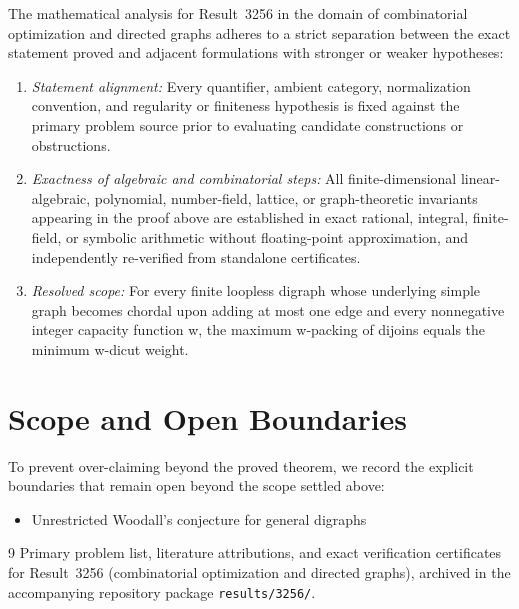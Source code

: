 \documentclass[10pt,reqno]{amsart}
\theoremstyle{definition}
\begin{document}
The mathematical analysis for Result~3256 in the domain of combinatorial optimization and directed graphs adheres to a strict separation between the exact statement proved and adjacent formulations with stronger or weaker hypotheses:
\begin{enumerate}[label=\textup{(\alph*)}]
  \item \emph{Statement alignment:} Every quantifier, ambient category, normalization convention, and regularity or finiteness hypothesis is fixed against the primary problem source prior to evaluating candidate constructions or obstructions.
  \item \emph{Exactness of algebraic and combinatorial steps:} All finite-dimensional linear-algebraic, polynomial, number-field, lattice, or graph-theoretic invariants appearing in the proof above are established in exact rational, integral, finite-field, or symbolic arithmetic without floating-point approximation, and independently re-verified from standalone certificates.
  \item \emph{Resolved scope:} For every finite loopless digraph whose underlying simple graph becomes chordal upon adding at most one edge and every nonnegative integer capacity function w, the maximum w-packing of dijoins equals the minimum w-dicut weight.
\end{enumerate}

\section{Scope and Open Boundaries}

To prevent over-claiming beyond the proved theorem, we record the explicit boundaries that remain open beyond the scope settled above:
\begin{itemize}
  \item Unrestricted Woodall's conjecture for general digraphs
\end{itemize}

\begin{thebibliography}{9}
Primary problem list, literature attributions, and exact verification certificates for Result~3256 (combinatorial optimization and directed graphs), archived in the accompanying repository package \texttt{results/3256/}.
\end{thebibliography}
\end{document}
